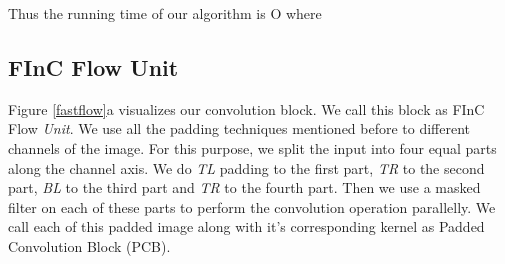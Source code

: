 \documentclass[a4paper,twoside]{article}
\theoremstyle{definition}
\begin{document}
Thus the running time of our algorithm is O where  

\begin{table*}[!t]
\caption{Comparison of the  bits per dimension (BPD), forward pass time (FT) and sampling time (ST) on standard benchmark datasets of various  convolution based Normalizing Flow models. FT and ST are presented in seconds.}
\centering

    \label{table:bpd_table}
\end{table*}

\subsection{FInC Flow Unit}\label{section:fastflowunit}

Figure \ref{fastflow}a visualizes our  convolution block. We call this block as FInC Flow \emph{Unit}. We use all the  padding techniques mentioned before to different channels of the image. For this purpose, we split the input into four equal parts along the channel axis. We do \emph{TL} padding to the first part, \emph{TR} to the second part, \emph{BL} to the third part and \emph{TR} to the fourth part. Then we use a masked filter on each of these parts to perform the convolution operation parallelly. We call each of this padded image along with it's corresponding kernel as Padded Convolution Block (PCB).
\end{document}
